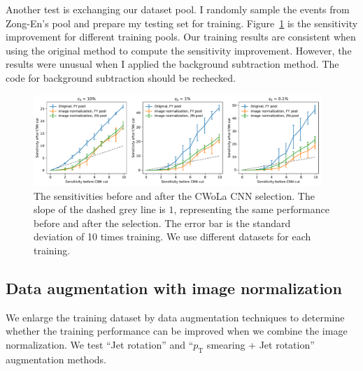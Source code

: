 \documentclass[12pt]{article}
\begin{document}
            Another test is exchanging our dataset pool. I randomly sample the events from Zong-En's pool and prepare my testing set for training. Figure~\ref{fig:sensitivity_improvement_image_pt_normalized_origin_FY_ZN_pool} is the sensitivity improvement for different training pools. Our training results are consistent when using the original method to compute the sensitivity improvement. However, the results were unusual when I applied the background subtraction method. The code for background subtraction should be rechecked.
            \begin{figure}[htpb]
                \centering
                \includegraphics[width=0.97\textwidth]{HVmodel_sensitivity_improvement_origin_image_pt_normalized_FY_ZN_pool.pdf}
                \caption{The sensitivities before and after the CWoLa CNN selection. The slope of the dashed grey line is $1$, representing the same performance before and after the selection. The error bar is the standard deviation of 10 times training. We use different datasets for each training.}
                \label{fig:sensitivity_improvement_image_pt_normalized_origin_FY_ZN_pool}
            \end{figure}
    \subsection{Data augmentation with image normalization}%
    \label{sub:data_augmentation_with_image_normalization}
        We enlarge the training dataset by data augmentation techniques to determine whether the training performance can be improved when we combine the image normalization. We test ``Jet rotation'' and ``$p_{\text{T}}$ smearing + Jet rotation'' augmentation methods.
\end{document}
